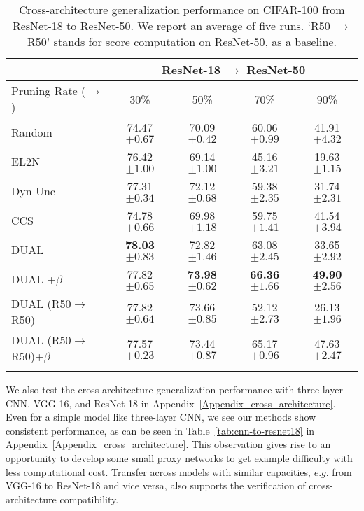 \begin{table}[t]
\caption{Cross-architecture generalization performance on CIFAR-100 from ResNet-18 to ResNet-50. We report an average of five runs. `R50 $\rightarrow$ R50' stands for score computation on ResNet-50, as a baseline.}
\label{tab:04-cross-arch-r18-r50}
\setlength{\tabcolsep}{3.1pt}
\centering
\begin{tabular}{lcccc}
    \toprule
    \multicolumn{1}{c}{} & \multicolumn{4}{c}{ResNet-18 $\rightarrow$ ResNet-50} \\
    \midrule
    Pruning Rate ($\rightarrow$) & 30\% & 50\% & 70\% & 90\% \\
    \hline
    \midrule
    Random & 74.47 \scriptsize{$\pm 0.67$} & 70.09 \scriptsize{$\pm 0.42$} & 60.06 \scriptsize{$\pm 0.99$} & 41.91 \scriptsize{$\pm 4.32 $} \\
    EL2N  & 76.42 \scriptsize{$\pm 1.00$} & 69.14 \scriptsize{$\pm 1.00$} & 45.16 \scriptsize{$\pm 3.21$} & 19.63 \scriptsize{$\pm 1.15 $} \\
    Dyn-Unc  & 77.31 \scriptsize{$\pm 0.34$} & 72.12 \scriptsize{$\pm 0.68$} & 59.38 \scriptsize{$\pm 2.35$} & 31.74 \scriptsize{$\pm 2.31 $} \\
    CCS  & 74.78 \scriptsize{$\pm 0.66$} & 69.98 \scriptsize{$\pm 1.18$} & 59.75 \scriptsize{$\pm 1.41$} & 41.54 \scriptsize{$\pm 3.94 $} \\
    \midrule
    DUAL   & \textbf{78.03} \scriptsize{$\pm 0.83$} & 72.82 \scriptsize{$\pm 1.46$} & 63.08 \scriptsize{$\pm 2.45$} & 33.65 \scriptsize{$\pm 2.92 $} \\
    DUAL +$\beta$  & 77.82 \scriptsize{$\pm 0.65$} & \textbf{73.98} \scriptsize{$\pm 0.62$} & \textbf{66.36} \scriptsize{$\pm 1.66$} & \textbf{49.90} \scriptsize{$\pm 2.56 $} \\
    \hline
    \midrule
    DUAL (R50$\rightarrow$R50)  & 77.82 \scriptsize{$\pm 0.64$} & 73.66 \scriptsize{$\pm 0.85$} & 52.12 \scriptsize{$\pm 2.73 $} & 26.13 \scriptsize{$\pm 1.96 $} \\
    DUAL (R50$\rightarrow$R50)+$\beta$  & 77.57 \scriptsize{$\pm 0.23$} & 73.44 \scriptsize{$\pm 0.87$} & 65.17 \scriptsize{$\pm 0.96$} & 47.63 \scriptsize{$\pm 2.47 $} \\
    \bottomrule
    \vspace{-10pt}
\end{tabular}
\end{table}

We also test the cross-architecture generalization performance with three-layer CNN, VGG-16, and ResNet-18 in Appendix~\ref{Appendix_cross_architecture}. 
Even for a simple model like three-layer CNN, we see our methods show consistent performance, as can be seen in Table~\ref{tab:cnn-to-resnet18} in Appendix~\ref{Appendix_cross_architecture}. This observation gives rise to an opportunity to develop some small proxy networks to get example difficulty with less computational cost. 
Transfer across models with similar capacities, $e.g.$ from VGG-16 to ResNet-18 and vice versa, also supports the verification of cross-architecture compatibility.   

